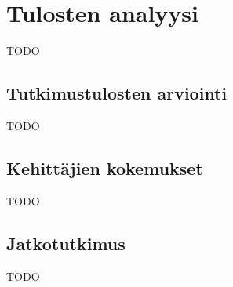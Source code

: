 \vspace{21.5pt}
\chapter{Tulosten analyysi}
TODO

\section{Tutkimustulosten arviointi}
TODO

\section{Kehittäjien kokemukset}
TODO

\section{Jatkotutkimus}

TODO
